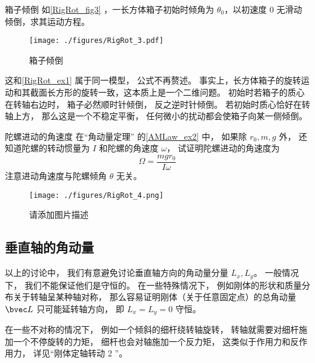 \begin{example}{箱子倾倒}
如\autoref{RigRot_fig3} ，一长方体箱子初始时倾角为 $\theta_0$，以初速度 0 无滑动倾倒，求其运动方程。
\begin{figure}[ht]
\centering
\texttt{[image: ./figures/RigRot\_3.pdf]}
\caption{箱子倾倒} \label{RigRot_fig3}
\end{figure}
这和\autoref{RigRot_ex1} 属于同一模型， 公式不再赘述。 事实上，长方体箱子的旋转运动和其截面长方形的旋转一致，这本质上是一个二维问题。 初始时若箱子的质心在转轴右边时， 箱子必然顺时针倾倒， 反之逆时针倾倒。 若初始时质心恰好在转轴上方， 那么这是一个不稳定平衡， 任何微小的扰动都会使箱子向某一侧倾倒。
\end{example}

\begin{exercise}{陀螺进动的角速度}\label{RigRot_exe1}
在“角动量定理” 的\autoref{AMLaw_ex2} 中， 如果除 $r_0, m, g$ 外， 还知道陀螺的转动惯量为 $I$ 和陀螺的角速度 $\omega$， 试证明陀螺进动的角速度为
\begin{equation}
\Omega = \frac{mgr_0}{I\omega}
\end{equation}
注意进动角速度与陀螺倾角 $\theta$ 无关。
\end{exercise}

\begin{example}{}\label{RigRot_ex2}
\begin{figure}[ht]
\centering
\texttt{[image: ./figures/RigRot\_4.png]}
\caption{请添加图片描述} \label{RigRot_fig4}
\end{figure}
\end{example}

\subsection{垂直轴的角动量}
以上的讨论中， 我们有意避免讨论垂直轴方向的角动量分量 $L_x, L_y$。 一般情况下， 我们不能保证他们是守恒的。 在一些特殊情况下， 例如刚体的形状和质量分布关于转轴呈某种轴对称， 那么容易证明刚体（关于任意固定点）的总角动量 $\bvec L$ 只可能延转轴方向， 即 $L_x = L_y = 0$ 守恒。 %

在一些不对称的情况下， 例如一个倾斜的细杆绕转轴旋转， %
转轴就需要对细杆施加一个不停旋转的力矩， 细杆也会对轴施加一个反力矩， 这类似于作用力和反作用力， 详见“刚体定轴转动 2 ”。
